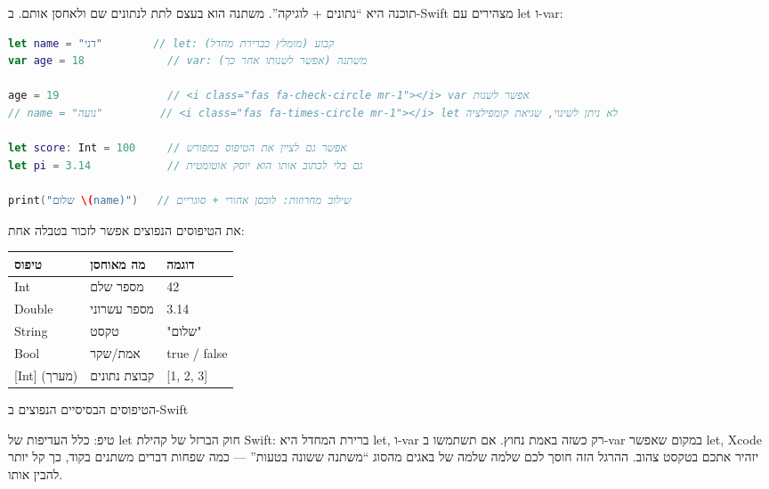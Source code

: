 


תוכנה היא “נתונים + לוגיקה”. משתנה הוא בעצם לתת לנתונים שם ולאחסן אותם. ב-Swift מצהירים עם let ו-var:

\begin{lstlisting}[language=Swift]
let name = "דני"        // let: קבוע (מומלץ כברירת מחדל)
var age = 18             // var: משתנה (אפשר לשנותו אחר כך)

age = 19                 // <i class="fas fa-check-circle mr-1"></i> var אפשר לשנות
// name = "נועה"         // <i class="fas fa-times-circle mr-1"></i> let לא ניתן לשינוי, שגיאת קומפילציה

let score: Int = 100     // אפשר גם לציין את הטיפוס במפורש
let pi = 3.14            // גם בלי לכתוב אותו הוא יוסק אוטומטית

print("שלום \(name)")   // שילוב מחרוזות: לוכסן אחורי + סוגריים
\end{lstlisting}

את הטיפוסים הנפוצים אפשר לזכור בטבלה אחת:

\begin{center}
\begin{tabularx}{\linewidth}{|X|X|X|}
\hline
\textbf{טיפוס} & \textbf{מה מאוחסן} & \textbf{דוגמה} \tabularnewline
\hline
Int & מספר שלם & 42 \tabularnewline
Double & מספר עשרוני & 3.14 \tabularnewline
String & טקסט & "שלום" \tabularnewline
Bool & אמת/שקר & true / false \tabularnewline
{}[Int] (מערך) & קבוצת נתונים & {}[1, 2, 3] \tabularnewline
\hline
\end{tabularx}
\end{center}

\begin{center}\small\color{gray}הטיפוסים הבסיסיים הנפוצים ב-Swift\end{center}

\begin{tcbinfo}{טיפ: כלל העדיפות של let}
חוק הברזל של קהילת Swift: ברירת המחדל היא let, ו-var רק כשזה באמת נחוץ. אם תשתמשו ב-var במקום שאפשר let, Xcode יזהיר אתכם בטקסט צהוב. ההרגל הזה חוסך לכם שלמה שלמה של באגים מהסוג “משתנה ששונה בטעות” — כמה שפחות דברים משתנים בקוד, כך קל יותר להבין אותו.

\end{tcbinfo}

